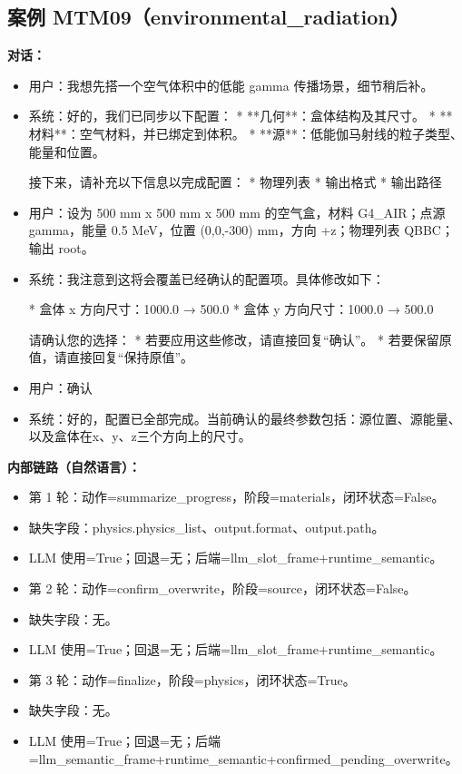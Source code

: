\documentclass[11pt]{ctexart}
\begin{document}
\subsection{案例 MTM09（environmental\_radiation）}
\textbf{对话：}
\begin{itemize}
\item 用户：我想先搭一个空气体积中的低能 gamma 传播场景，细节稍后补。
\item 系统：好的，我们已同步以下配置：
*   **几何**：盒体结构及其尺寸。
*   **材料**：空气材料，并已绑定到体积。
*   **源**：低能伽马射线的粒子类型、能量和位置。

接下来，请补充以下信息以完成配置：
*   物理列表
*   输出格式
*   输出路径
\item 用户：设为 500 mm x 500 mm x 500 mm 的空气盒，材料 G4\_AIR；点源 gamma，能量 0.5 MeV，位置 (0,0,-300) mm，方向 +z；物理列表 QBBC；输出 root。
\item 系统：我注意到这将会覆盖已经确认的配置项。具体修改如下：

*   盒体 x 方向尺寸：1000.0 → 500.0
*   盒体 y 方向尺寸：1000.0 → 500.0

请确认您的选择：
*   若要应用这些修改，请直接回复“确认”。
*   若要保留原值，请直接回复“保持原值”。
\item 用户：确认
\item 系统：好的，配置已全部完成。当前确认的最终参数包括：源位置、源能量、以及盒体在x、y、z三个方向上的尺寸。
\end{itemize}
\textbf{内部链路（自然语言）：}
\begin{itemize}
\item 第 1 轮：动作=summarize\_progress，阶段=materials，闭环状态=False。
\item 缺失字段：physics.physics\_list、output.format、output.path。
\item LLM 使用=True；回退=无；后端=llm\_slot\_frame+runtime\_semantic。
\item 第 2 轮：动作=confirm\_overwrite，阶段=source，闭环状态=False。
\item 缺失字段：无。
\item LLM 使用=True；回退=无；后端=llm\_slot\_frame+runtime\_semantic。
\item 第 3 轮：动作=finalize，阶段=physics，闭环状态=True。
\item 缺失字段：无。
\item LLM 使用=True；回退=无；后端=llm\_semantic\_frame+runtime\_semantic+confirmed\_pending\_overwrite。
\end{itemize}
\end{document}
